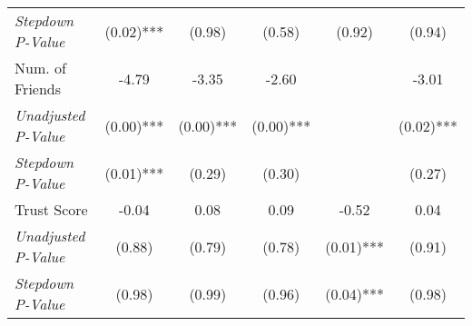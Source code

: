 \begin{tabular}{l c c c c c}
\quad \textit{Stepdown P-Value} & (0.02)*** & (0.98) & (0.58) & (0.92) & (0.94) \\
Num. of Friends & -4.79 & -3.35 & -2.60 & & -3.01 \\
\quad \textit{Unadjusted P-Value} & (0.00)*** & (0.00)*** & (0.00)*** & & (0.02)*** \\
\quad \textit{Stepdown P-Value} & (0.01)*** & (0.29) & (0.30) & & (0.27) \\
Trust Score & -0.04 & 0.08 & 0.09 & -0.52 & 0.04 \\
\quad \textit{Unadjusted P-Value} & (0.88) & (0.79) & (0.78) & (0.01)*** & (0.91) \\
\quad \textit{Stepdown P-Value} & (0.98) & (0.99) & (0.96) & (0.04)*** & (0.98) \\
\bottomrule
\end{tabular}
